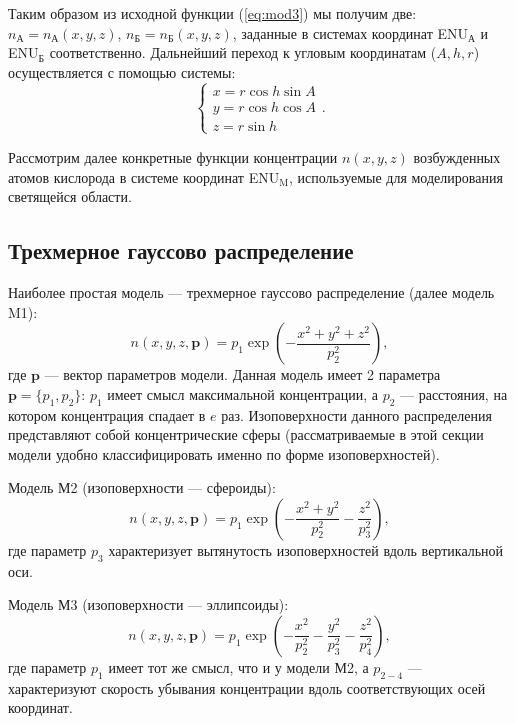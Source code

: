 \documentclass[12pt,a4paper]{article}
\renewcommand{\vec}{\mathbf}
\begin{document}
Таким образом из исходной функции (\ref{eq:mod3}) мы получим две: $n_\text{А}=n_\text{А}(x,y,z)$, $n_\text{Б}=n_\text{Б}(x,y,z)$, заданные в системах координат ENU$_\text{А}$ и ENU$_\text{Б}$ соответственно. Дальнейший переход к угловым координатам ($A,h,r$) осуществляется с помощью системы:
\begin{equation}\label{eq:mod8}
\begin{cases}
x = r\cos{h}\sin{A} \\
y = r\cos{h}\cos{A} \\
z = r\sin{h}
\end{cases}.
\end{equation}

Рассмотрим далее конкретные функции концентрации $n(x,y,z)$ возбужденных атомов кислорода в системе координат ENU$_\text{M}$, используемые для моделирования светящейся области.

\subsection{Трехмерное гауссово распределение} \label{subsec:model1}

Наиболее простая модель --- трехмерное гауссово распределение (далее модель M1):
\begin{equation}\label{eq:gauss1}
n(x,y,z,\vec{p})=p_1 \exp{(-\frac{x^2+y^2+z^2}{p_2^2})},
\end{equation}
где $\vec{p}$ --- вектор параметров модели. Данная модель имеет 2 параметра $\vec{p}=\{p_1,p_2\}$: $p_1$ имеет смысл максимальной концентрации, а $p_2$ --- расстояния, на котором концентрация спадает в $e$ раз. Изоповерхности данного распределения представляют собой концентрические сферы (рассматриваемые в этой секции модели удобно классифицировать именно по форме изоповерхностей). 

Модель М2 (изоповерхности --- сфероиды):
\begin{equation}\label{eq:gauss2}
	n(x,y,z,\vec{p})=p_1 \exp{(-\frac{x^2+y^2}{p_2^2}-\frac{z^2}{p_3^2})},
\end{equation}
где параметр $p_3$ характеризует вытянутость изоповерхностей вдоль вертикальной оси.

Модель М3 (изоповерхности --- эллипсоиды):
\begin{equation}\label{eq:gauss3}
n(x,y,z,\vec{p})=p_1 \exp{(-\frac{x^2}{p_2^2}-\frac{y^2}{p_3^2}-\frac{z^2}{p_4^2})},
\end{equation}
где параметр $p_{1}$ имеет тот же смысл, что и у модели М2, а $p_{2-4}$ --- 
характеризуют скорость убывания концентрации вдоль соответствующих осей координат.
\end{document}
